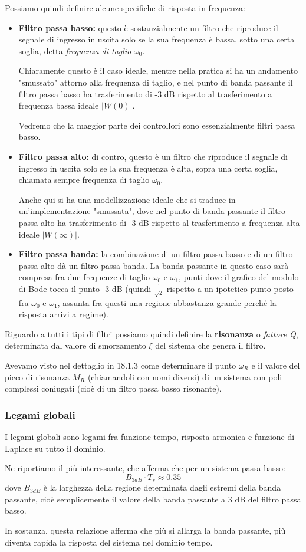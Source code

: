 \documentclass[a4paper,11pt]{article}
\begin{document}
Possiamo quindi definire alcune specifiche di risposta in frequenza:
\begin{itemize}
	\item \textbf{Filtro passa basso:} questo è sostanzialmente un filtro che riproduce il segnale di ingresso in uscita solo se la sua frequenza è bassa, sotto una certa soglia, detta \textit{frequenza di taglio} $\omega_0$.

		Chiaramente questo è il caso ideale, mentre nella pratica si ha un andamento "smussato" attorno alla frequenza di taglio, e nel punto di banda passante il filtro passa basso ha trasferimento di -3 dB rispetto al trasferimento a frequenza bassa ideale $|W(0)|$.

		Vedremo che la maggior parte dei controllori sono essenzialmente filtri passa basso.
	\item \textbf{Filtro passa alto:} di contro, questo è un filtro che riproduce il segnale di ingresso in uscita solo se la sua frequenza è alta, sopra una certa soglia, chiamata sempre frequenza di taglio $\omega_0$.

		Anche qui si ha una modellizzazione ideale che si traduce in un'implementazione "smussata", dove nel punto di banda passante il filtro passa alto ha trasferimento di -3 dB rispetto al trasferimento a frequenza alta ideale $|W(\infty)|$.
	\item \textbf{Filtro passa banda:} la combinazione di un filtro passa basso e di un filtro passa alto dà un filtro passa banda.
		La banda passante in questo caso sarà compresa fra due frequenze di taglio $\omega_0$ e $\omega_1$, punti dove il grafico del modulo di Bode tocca il punto -3 dB (quindi $\frac{1}{\sqrt{2}}$ rispetto a un ipotetico punto posto fra $\omega_0$ e $\omega_1$, assunta fra questi una regione abbastanza grande perché la risposta arrivi a regime).
\end{itemize}

Riguardo a tutti i tipi di filtri possiamo quindi definire la \textbf{risonanza} o \textit{fattore Q}, determinata dal valore di smorzamento $\xi$ del sistema che genera il filtro.

Avevamo visto nel dettaglio in 18.1.3 come determinare il punto $\omega_R$ e il valore del picco di risonanza $M_R$ (chiamandoli con nomi diversi) di un sistema con poli complessi coniugati (cioè di un filtro passa basso risonante). 

\subsubsection{Legami globali}
I legami globali sono legami fra funzione tempo, risposta armonica e funzione di Laplace su tutto il dominio.

Ne riportiamo il più interessante, che afferma che per un sistema passa basso:
$$
B_{3dB} \cdot T_s \approx 0.35
$$
dove $B_{3dB}$ è la larghezza della regione determinata dagli estremi della banda passante, cioè semplicemente il valore della banda passante a 3 dB del filtro passa basso.

In sostanza, questa relazione afferma che più si allarga la banda passante, più diventa rapida la risposta del sistema nel dominio tempo. 
\end{document}
